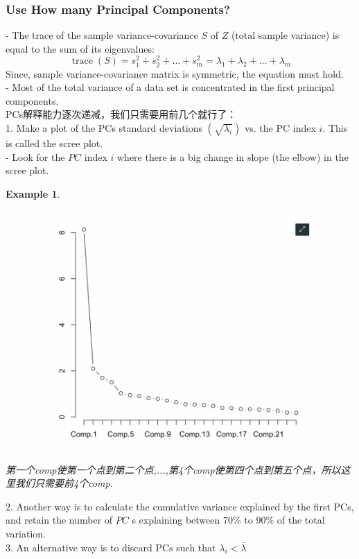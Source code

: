 \documentclass[11pt,a4paper]{article}
\newtheorem{example}{Example}
\begin{document}
\subsubsection{Use How many Principal Components?}
- The trace of the sample variance-covariance $S$ of $Z$ (total sample variance) is equal to the sum of its eigenvalues:
$$
\operatorname{trace}(S)=s_{1}^{2}+s_{2}^{2}+\ldots+s_{m}^{2}=\lambda_{1}+\lambda_{2}+\ldots+\lambda_{m}
$$
Since, sample variance-covariance matrix is symmetric, the equation must hold.\\
- Most of the total variance of a data set is concentrated in the first principal components.\\
PCs解释能力逐次递减，我们只需要用前几个就行了：\\
1. Make a plot of the PCs standard deviations $\left(\sqrt{\lambda_{i}}\right)$ vs. the PC index $i$. This is called the scree plot.\\
- Look for the $P C$ index $i$ where there is a big change in slope (the elbow) in the scree plot.\\
\begin{example}
\begin{center}\begin{figure}[htbp]
    \centering
    \includegraphics[scale=0.5]{elbow}
    \caption{}
    \label{}
\end{figure}\end{center}
第一个comp使第一个点到第二个点,...,第4个comp使第四个点到第五个点，所以这里我们只需要前4个comp.
\end{example}
2. Another way is to calculate the cumulative variance explained by the first PCs, and retain the number of $P C$ s explaining between $70 \%$ to $90 \%$ of the total variation.\\
3. An alternative way is to discard $\mathrm{PCs}$ such that $\lambda_{i}<\bar{\lambda}$
\end{document}
